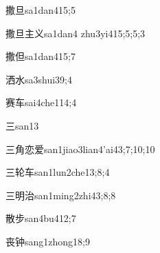 
\begin{verbete}{撒旦}{sa1dan4}{15;5}
\end{verbete}

\begin{verbete}{撒旦主义}{sa1dan4 zhu3yi4}{15;5;5;3}
\end{verbete}

\begin{verbete}{撒但}{sa1dan4}{15;7}
\end{verbete}

\begin{verbete}{洒水}{sa3shui3}{9;4}
\end{verbete}

\begin{verbete}{赛车}{sai4che1}{14;4}
\end{verbete}

\begin{verbete}{三}{san1}{3}
\end{verbete}

\begin{verbete}{三角恋爱}{san1jiao3lian4'ai4}{3;7;10;10}
\end{verbete}

\begin{verbete}{三轮车}{san1lun2che1}{3;8;4}
\end{verbete}

\begin{verbete}{三明治}{san1ming2zhi4}{3;8;8}
\end{verbete}

\begin{verbete}{散步}{san4bu4}{12;7}
\end{verbete}

\begin{verbete}{丧钟}{sang1zhong1}{8;9}
\end{verbete}

